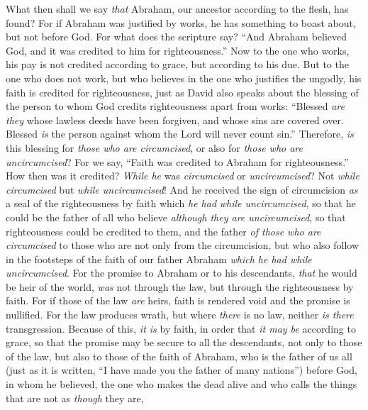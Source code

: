 \begin{biblechapter} %
 What then shall we say \textit{that} Abraham, our ancestor according to the flesh, has found?
\verse For if Abraham was justified by works, he has something to boast about, but not before God.
\verse For what does the scripture say? “And Abraham believed God, and it was credited to him for righteousness.”
\verse Now to the one who works, his pay is not credited according to grace, but according to his due.
\verse But to the one who does not work, but who believes in the one who justifies the ungodly, his faith is credited for righteousness,
\verse just as David also speaks about the blessing of the person to whom God credits righteousness apart from works:
\verse “Blessed \textit{are they} whose lawless deeds have been forgiven, 
and whose sins are covered over.
\verse Blessed \textit{is} the person against whom the Lord will never count sin.”
\verse Therefore, \textit{is} this blessing for \textit{those who are circumcised}, or also for \textit{those who are uncircumcised}? For we say, “Faith was credited to Abraham for righteousness.”
\verse How then was it credited? \textit{While he} was \textit{circumcised} or \textit{uncircumcised}? Not \textit{while circumcised} but \textit{while uncircumcised}!
\verse And he received the sign of circumcision \textit{as} a seal of the righteousness by faith which \textit{he had} \textit{while uncircumcised}, so that he could be the father of all who believe \textit{although they are uncircumcised}, so that righteousness could be credited to them,
\verse and the father \textit{of those who are circumcised} to those who are not only from the circumcision, but who also follow in the footsteps of the faith of our father Abraham \textit{which he had while uncircumcised}.
 For the promise to Abraham or to his descendants, \textit{that} he would be heir of the world, \textit{was} not through the law, but through the righteousness by faith.
\verse For if those of the law \textit{are} heirs, faith is rendered void and the promise is nullified.
\verse For the law produces wrath, but where \textit{there} is no law, neither \textit{is there} transgression.
\verse Because of this, \textit{it is} by faith, in order that \textit{it may be} according to grace, so that the promise may be secure to all the descendants, not only to those of the law, but also to those of the faith of Abraham, who is the father of us all
\verse (just as it is written, “I have made you the father of many nations”) before God, in whom he believed, the one who makes the dead alive and who calls the things that are not as \textit{though} they are,

\end{biblechapter}
